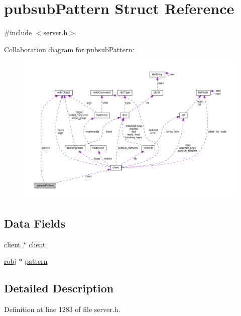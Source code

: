 \hypertarget{structpubsub_pattern}{}\section{pubsub\+Pattern Struct Reference}
\label{structpubsub_pattern}


{\ttfamily \#include $<$server.\+h$>$}



Collaboration diagram for pubsub\+Pattern\+:
\nopagebreak
\begin{figure}[H]
\begin{center}
\leavevmode
\includegraphics[width=350pt]{structpubsub_pattern__coll__graph}
\end{center}
\end{figure}
\subsection*{Data Fields}
\begin{DoxyCompactItemize}
\item 
\hyperlink{structclient}{client} $\ast$ \hyperlink{structpubsub_pattern_a6d99956d3d06c98958feb17baf491c71}{client}
\item 
\hyperlink{server_8h_a540f174d2685422fbd7d12e3cd44c8e2}{robj} $\ast$ \hyperlink{structpubsub_pattern_a779898a32e09ec217b6876501caecc9c}{pattern}
\end{DoxyCompactItemize}


\subsection{Detailed Description}


Definition at line 1283 of file server.\+h.



